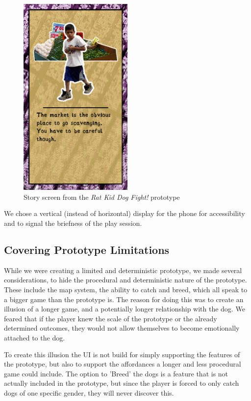 \begin{figure}[h!] 
	\centering
    \includegraphics[width=0.5\textwidth]{GameScreen1.png}
    \caption{Story screen from the \textit{Rat Kid Dog Fight!} prototype}
    \label{fig:GameScreen}
\end{figure}


We chose a vertical (instead of horizontal) display for the phone for accessibility and to signal the briefness of the play session.

\subsection{Covering Prototype Limitations}
\label{limitations}
While we were creating a limited and deterministic prototype, we made several considerations, to hide the procedural and deterministic nature of the prototype. These include the map system, the ability to catch and breed, which all speak to a bigger game than the prototype is. The reason for doing this was to create an illusion of a longer game, and a potentially longer relationship with the dog. We feared that if the player knew the scale of the prototype or the already determined outcomes, they would not allow themselves to become emotionally attached to the dog. \

To create this illusion the UI is not build for simply supporting the features of the prototype, but also to support the affordances a longer and less procedural game could include. The option to 'Breed' the dogs is a feature that is not actually included in the prototype, but since the player is forced to only catch dogs of one specific gender, they will never discover this.\

